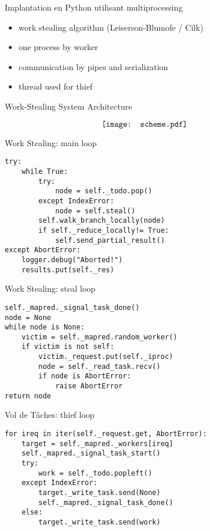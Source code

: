 \documentclass[compress,11pt]{beamer}
\begin{document}
\begin{frame}{Implantation en Python utilisant multiprocessing}

  \begin{itemize}
  \item work stealing algorithm (Leiserson-Blumofe / Cilk)
    \bigskip

  \item one process by worker
    \bigskip

  \item communication by pipes and serialization
    \bigskip

  \item thread used for thief
  \end{itemize}

\end{frame}

\begin{frame}{Work-Stealing System Architecture}

\[\hspace{-0.7cm}\texttt{[image: scheme.pdf]}\]
\end{frame}

\begin{frame}[fragile]{Work Stealing: main loop}
\begin{verbatim}
try:
    while True:
        try:
            node = self._todo.pop()
        except IndexError:
            node = self.steal()
        self.walk_branch_locally(node)
        if self._reduce_locally!= True:
            self.send_partial_result()
except AbortError:
    logger.debug("Aborted!")
    results.put(self._res)
\end{verbatim}
\end{frame}

\begin{frame}[fragile]{Work Stealing: steal loop}
\begin{verbatim}
self._mapred._signal_task_done()
node = None
while node is None:
    victim = self._mapred.random_worker()
    if victim is not self:
        victim._request.put(self._iproc)
        node = self._read_task.recv()
        if node is AbortError:
            raise AbortError
return node
\end{verbatim}
\end{frame}

\begin{frame}[fragile]{Vol de Tâches: thief loop}
\begin{verbatim}
for ireq in iter(self._request.get, AbortError):
    target = self._mapred._workers[ireq]
    self._mapred._signal_task_start()
    try:
        work = self._todo.popleft()
    except IndexError:
        target._write_task.send(None)
        self._mapred._signal_task_done()
    else:
        target._write_task.send(work)
\end{verbatim}
\end{frame}
\end{document}
